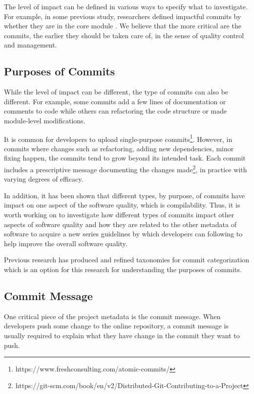 The level of impact can be defined in various ways to specify what to investigate. For example, in some previous study, researchers defined impactful commits by whether they are in the core module \cite{pooyan_esem, pooyan_qrs}.
We believe that the more critical are the commits, the earlier they should be taken care of, in the sense of quality control and management. 


\subsection{Purposes of Commits}
While the level of impact can be different, the type of commits can also be different.
For example, some commits add a few lines of documentation or comments to code while others can refactoring the code structure or made module-level modifications.

It is common for developers to upload single-purpose commits\footnote{https://www.freshconsulting.com/atomic-commits/}. 
However, in commits where changes such as refactoring, adding new dependencies, minor fixing happen, the commits tend to grow beyond its intended task. 
Each commit includes a prescriptive message documenting the changes made\footnote{https://git-scm.com/book/en/v2/Distributed-Git-Contributing-to-a-Project}, in practice with varying degrees of efficacy. 

In addition, it has been shown that different types, by purpose, of commits have impact on one aspect of the software quality, which is compilability\cite{qrs2020}.
Thus, it is worth working on to investigate how different types of commits impact other aspects of software quality and how they are related to the other metadata of software to acquire a new series guidelines by which developers can following to help improve the overall software quality.

Previous research has produced and refined taxonomies for commit categorization \cite{Hindle_cate,Alali,Dragan,Swanson, Mauczka, Hindle_auto,qrs2020} which is an option for this research for understanding the purposes of commits.



\subsection{Commit Message}
One critical piece of the project metadata is the commit message. 
When developers push some change to the online repository, a commit message is usually required to explain what they have change in the commit they want to push.

